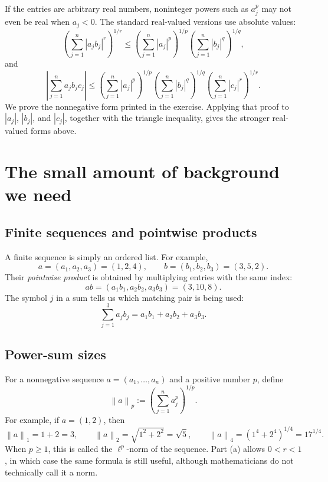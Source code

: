 \documentclass[11pt]{article}
\newcommand{\abs}[1]{\left|#1\right|}
\newcommand{\norm}[1]{\left\lVert #1\right\rVert}
\begin{document}
\begin{warningBox}
If the entries are arbitrary real numbers, noninteger powers such as \(a_j^p\) may not even be real when \(a_j<0\). The standard real-valued versions use absolute values:
\[
 \left(\sum_{j=1}^{n}\abs{a_jb_j}^{r}\right)^{1/r}
 \leq
 \left(\sum_{j=1}^{n}\abs{a_j}^{p}\right)^{1/p}
 \left(\sum_{j=1}^{n}\abs{b_j}^{q}\right)^{1/q},
 \tag{A$'$}
\]
and
\[
 \abs{\sum_{j=1}^{n}a_jb_jc_j}
 \leq
 \left(\sum_{j=1}^{n}\abs{a_j}^{p}\right)^{1/p}
 \left(\sum_{j=1}^{n}\abs{b_j}^{q}\right)^{1/q}
 \left(\sum_{j=1}^{n}\abs{c_j}^{r}\right)^{1/r}.
 \tag{B$'$}
\]
We prove the nonnegative form printed in the exercise. Applying that proof to \(\abs{a_j}\), \(\abs{b_j}\), and \(\abs{c_j}\), together with the triangle inequality, gives the stronger real-valued forms above.
\end{warningBox}

\section{The small amount of background we need}

\subsection{Finite sequences and pointwise products}

A finite sequence is simply an ordered list. For example,
\[
  a=(a_1,a_2,a_3)=(1,2,4),
  \qquad
  b=(b_1,b_2,b_3)=(3,5,2).
\]
Their \emph{pointwise product} is obtained by multiplying entries with the same index:
\[
  ab=(a_1b_1,a_2b_2,a_3b_3)=(3,10,8).
\]
The symbol \(j\) in a sum tells us which matching pair is being used:
\[
  \sum_{j=1}^{3}a_jb_j=a_1b_1+a_2b_2+a_3b_3.
\]

\subsection{Power-sum sizes}

For a nonnegative sequence \(a=(a_1,\ldots,a_n)\) and a positive number \(p\), define
\[
  \norm{a}_p:=\left(\sum_{j=1}^{n}a_j^p\right)^{1/p}.
  \tag{1}
\]
For example, if \(a=(1,2)\), then
\[
 \norm{a}_1=1+2=3,
 \qquad
 \norm{a}_2=\sqrt{1^2+2^2}=\sqrt5,
 \qquad
 \norm{a}_4=(1^4+2^4)^{1/4}=17^{1/4}.
\]
When \(p\geq1\), this is called the \(\ell^p\)-norm of the sequence. Part (a) allows \(0<r<1\), in which case the same formula is still useful, although mathematicians do not technically call it a norm.
\end{document}
